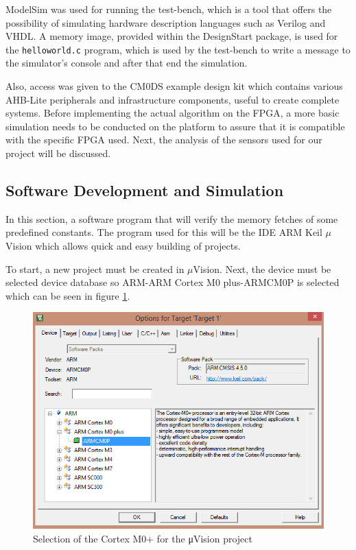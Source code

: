 ModelSim was used for running the test-bench, which is a tool that offers the possibility of simulating hardware description languages such as Verilog and VHDL.  A memory image, provided within the DesignStart package, is used for the \verb|helloworld.c| program, which is used by the test-bench to write a message to the simulator's console and after that end the simulation. 

Also, access was given to the CM0DS example design kit which contains various AHB-Lite peripherals and infrastructure components, useful to create complete systems. Before implementing the actual algorithm on the FPGA, a more basic simulation needs to be conducted on the platform to assure that it is compatible with the specific FPGA used. Next, the analysis of the sensors used for our project will be discussed. 


\subsection{Software Development and Simulation}
In this section, a software program that will verify the memory fetches of some predefined constants. The program used for this will be the IDE ARM Keil $\mu$Vision which allows quick and easy building of projects.

To start, a new project must be created in $\mu$Vision. Next, the device must be selected device database so ARM-ARM Cortex M0 plus-ARMCM0P is selected which can be seen in figure \ref{fig:armcm0p}.

\begin{figure}[b]
\centering
\includegraphics[scale=0.7]{figures/armcm0p.PNG}
\caption{Selection of the Cortex M0+ for the μVision project} 
\label{fig:armcm0p}
\end{figure}

